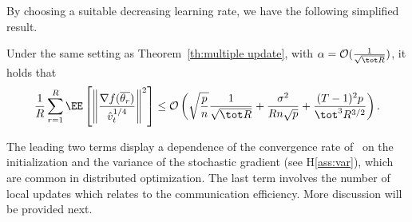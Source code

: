 \documentclass[manuscript,screen,review]{acmart}
\begin{document}
By choosing a suitable decreasing learning rate, we have the following simplified result.
\begin{Corollary}\label{coro:main}
Under the same setting as Theorem~\ref{th:multiple update}, with $\alpha = \mathcal{O}(\frac{1}{ \sqrt{\tot R}})$, it holds that
\begin{align} \label{coro:rate}
\frac{1}{R}\sum_{r=1}^R  \EE\left[ \left\| \frac{\nabla f(\overline{\theta_r})}{\hat v_t^{1/4}}   \right \|^2 \right]\leq \mathcal{O}\left( \sqrt{\frac{ p}{n}} \frac{1}{\sqrt{\tot R}} + \frac{\sigma^2 }{R n\sqrt{p}}+\frac{(T-1)^2p}{\tot^3 R^{3/2}}\right).
\end{align}
\end{Corollary}

The leading two terms display a dependence of the convergence rate of \algo\ on the initialization and the variance of the stochastic gradient (see H\ref{ass:var}), which are common in distributed optimization. The last term involves the number of local updates which relates to the communication efficiency. More discussion will be provided next.



\end{document}
